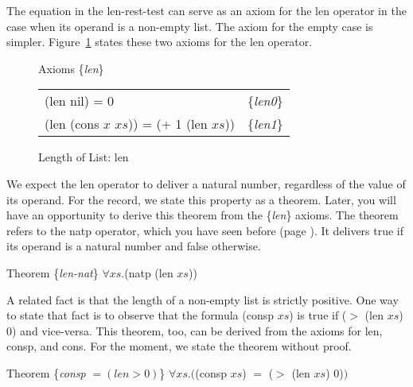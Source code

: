 The equation in the len-rest-test can serve
as an axiom for the len operator in the case
when its operand is a non-empty list.
The axiom for the empty case is simpler.
Figure~\ref{fig:len-axioms} states these two axioms for
the len operator.

\begin{figure}
\begin{center}
Axioms \{\emph{len}\} \\
\begin{tabular}{ll}
(len nil) = 0                            & \{\emph{len0}\} \\
(len (cons $x$ $xs$)) = (+ 1 (len $xs$)) & \{\emph{len1}\}
\end{tabular}
\end{center}
\caption{Length of List: len}
\label{len-equations}
\label{fig:len-axioms}
\end{figure}

We expect the len operator to deliver a natural number,
regardless of the value of its operand.
For the record, we state this property as a theorem.
Later, you will have an opportunity to derive
this theorem from the \{\emph{len}\} axioms.
The theorem refers to the natp operator,
which you have seen before (page \pageref{natp-op}).
It delivers true if its operand is a natural number and false otherwise.
\begin{samepage}
\label{len-nat-thm}
\begin{center}
Theorem \{\emph{len-nat}\} $\forall xs.$(natp (len $xs$))
\end{center}
\end{samepage}

A related fact is that the length of a non-empty list is strictly positive.
One way to state that fact is to observe that the formula (consp $xs$) is true
if ($>$ (len $xs$) 0) and vice-versa. %
This theorem, too, can be derived from the axioms for
len, consp, and cons. For the moment,
we state the theorem without proof.
\begin{samepage}
\label{consp-len-thm}
\begin{center}
Theorem \{\emph{consp} $= (len > 0)$\} $\forall xs.($(consp $xs$) $=$ ($>$ (len $xs$) 0)$)$
\end{center}
\end{samepage}

